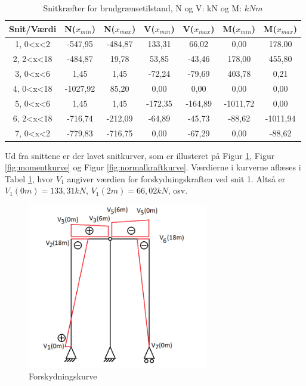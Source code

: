 \begin{table}
	\begin{center}
		\begin{tabular}{|c|c|c|c|c|c|c|}
			\hline
			Snit/Værdi & N($x_{min}$) & N($x_{max}$) & V($x_{min}$) & V($x_{max}$) & M($x_{min}$) & M($x_{max}$) 	\\ \hline
			1, 0<x<2  & -547,95       & -484,87    	&  133,31    	&  66,02 	&  0,00     &  178.00        		\\ \hline
			2, 2<x<18 &  -484,87        &  19,78       &  53,85      & -43,46   &  178,00  &  455,80    \\ \hline
			3, 0<x<6  & 1,45       &  1,45     &  -72,24         &  -79,69     &  403,78     &  0,21 			    \\ \hline
			4, 0<x<18 &  -1027,92       &  85,20      &  0,00        &  0,00    &  0,00   &   0,00    \\ \hline
			5, 0<x<6  &  1,45     &    1,45      &  -172,35      &  -164,89     &   -1011,72        &   0,00      		\\ \hline
			6, 2<x<18 &  -716,74  &   -212,09  &   -64,89    &   -45,73    &    -88,62       &   -1011,94      		\\ \hline
			7, 0<x<2 &  -779,83        &   -716,75       &     0,00      &   -67,29   &    0,00     &    -88,62     		\\ \hline
		\end{tabular}
		\caption{Snitkræfter for brudgrænsetilstand, N og V: kN og M: $kNm$}
		\label{tab:resultaterbrud}
	\end{center}
\end{table}

Ud fra snittene er der lavet snitkurver, som er illusteret på Figur \ref{fig:forskydningskurve}, Figur \ref{fig:momentkurve} og Figur \ref{fig:normalkraftkurve}. Værdierne i kurverne aflæses i Tabel \ref{tab:resultaterbrud}, hvor $V_1$ angiver værdien for forskydningskraften ved snit 1. Altså er $V_1(0m) = 133,31 kN$, $V_1(2m) = 66,02 kN$, osv.

\begin{figure}[H]
	\centering
	\includegraphics[width=0.7\textwidth]{billeder/sk.png}
	\caption{Forskydningskurve}
	\label{fig:forskydningskurve}
\end{figure}

